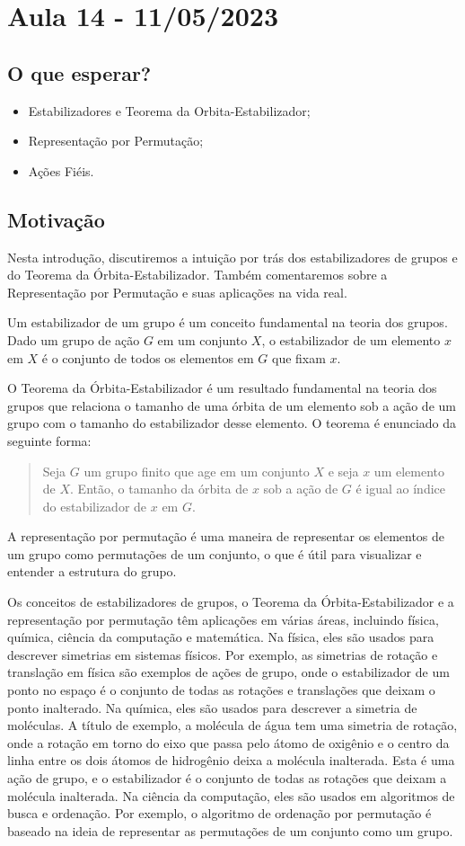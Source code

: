 \documentclass[Algebra/algebra_notes.tex]{subfiles}
\begin{document}
\section{Aula 14 - 11/05/2023}
\subsection{O que esperar?}
\begin{itemize}
	\item Estabilizadores e Teorema da Orbita-Estabilizador;
	\item Representação por Permutação;
	\item Ações Fiéis.
\end{itemize}
\subsection{Motivação}
Nesta introdução, discutiremos a intuição por trás dos estabilizadores de grupos e do Teorema da Órbita-Estabilizador. Também comentaremos sobre a
Representação por Permutação e suas aplicações na vida real.

Um estabilizador de um grupo é um conceito fundamental na teoria dos grupos. Dado um grupo de ação $G$ em um conjunto $X$, o estabilizador de um elemento
$x$ em $X$ é o conjunto de todos os elementos em $G$ que fixam $x$.

O Teorema da Órbita-Estabilizador é um resultado fundamental na teoria dos grupos que relaciona o tamanho de uma órbita de um elemento sob a ação de um grupo
com o tamanho do estabilizador desse elemento. O teorema é enunciado da seguinte forma:
\begin{quote}
	Seja $G$ um grupo finito que age em um conjunto $X$ e seja $x$ um elemento de $X$. Então, o tamanho da órbita de $x$ sob a ação de $G$ é igual ao
	índice do estabilizador de $x$ em $G$.
\end{quote}

A representação por permutação é uma maneira de representar os elementos de um grupo como permutações de um conjunto, o que é útil para visualizar e entender
a estrutura do grupo.

Os conceitos de estabilizadores de grupos, o Teorema da Órbita-Estabilizador e a representação por permutação têm aplicações em várias áreas, incluindo
física, química, ciência da computação e matemática.
Na física, eles são usados para descrever simetrias em sistemas físicos. Por exemplo, as simetrias de rotação e translação em física são exemplos de ações de grupo, onde o estabilizador de um ponto no espaço é o conjunto de todas as rotações e translações que deixam o ponto inalterado.
Na química, eles são usados para descrever a simetria de moléculas. A título de exemplo, a molécula de água tem uma simetria de rotação, onde a rotação em torno do eixo que passa pelo átomo de oxigênio e o centro da linha entre os dois átomos de hidrogênio deixa a molécula inalterada. Esta é uma ação de grupo, e o estabilizador é o conjunto de todas as rotações que deixam a molécula inalterada.
Na ciência da computação, eles são usados em algoritmos de busca e ordenação. Por exemplo, o algoritmo de ordenação por permutação é baseado na ideia de representar as permutações de um conjunto como um grupo.
\end{document}
